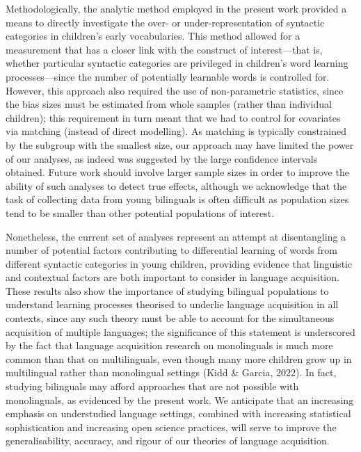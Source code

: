 \documentclass[10pt, letterpaper]{article}
\begin{document}
Methodologically, the analytic method employed in the present work
provided a means to directly investigate the over- or
under-representation of syntactic categories in children's early
vocabularies. This method allowed for a measurement that has a closer
link with the construct of interest---that is, whether particular
syntactic categories are privileged in children's word learning
processes---since the number of potentially learnable words is
controlled for. However, this approach also required the use of
non-parametric statistics, since the bias sizes must be estimated from
whole samples (rather than individual children); this requirement in
turn meant that we had to control for covariates via matching (instead
of direct modelling). As matching is typically constrained by the
subgroup with the smallest size, our approach may have limited the power
of our analyses, as indeed was suggested by the large confidence
intervals obtained. Future work should involve larger sample sizes in
order to improve the ability of such analyses to detect true effects,
although we acknowledge that the task of collecting data from young
bilinguals is often difficult as population sizes tend to be smaller
than other potential populations of interest.

Nonetheless, the current set of analyses represent an attempt at
disentangling a number of potential factors contributing to differential
learning of words from different syntactic categories in young children,
providing evidence that linguistic and contextual factors are both
important to consider in language acquisition. These results also show
the importance of studying bilingual populations to understand learning
processes theorised to underlie language acquisition in all contexts,
since any such theory must be able to account for the simultaneous
acquisition of multiple languages; the significance of this statement is
underscored by the fact that language acquisition research on
monolinguals is much more common than that on multilinguals, even though
many more children grow up in multilingual rather than monolingual
settings (Kidd \& Garcia, 2022). In fact, studying bilinguals may afford
approaches that are not possible with monolinguals, as evidenced by the
present work. We anticipate that an increasing emphasis on understudied
language settings, combined with increasing statistical sophistication
and increasing open science practices, will serve to improve the
generalisability, accuracy, and rigour of our theories of language
acquisition.

\newpage
\end{document}
